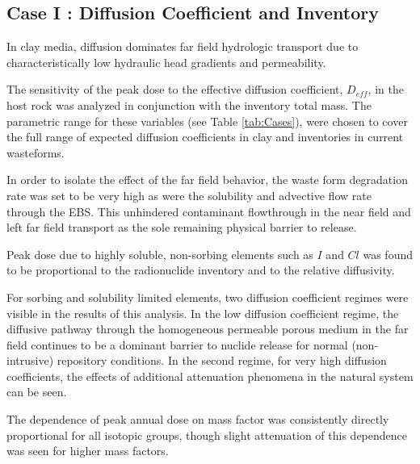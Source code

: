 
\subsection{Case I : Diffusion Coefficient and Inventory }
\label{sec:diffusivity}

In clay media, diffusion dominates far field hydrologic transport due to 
characteristically low hydraulic head gradients and permeability. 

The sensitivity of the peak dose to the effective diffusion coefficient, 
$D_{eff}$, in the host rock was analyzed in conjunction with the inventory 
total mass. The parametric range for these variables (see Table 
\ref{tab:Cases}), were chosen to cover the full range of expected diffusion 
coefficients in clay and inventories in current wasteforms.

In order to isolate the effect of the far field behavior, the waste form 
degradation rate was set to be very high as were the solubility and advective 
flow rate through the  \gls{EBS}. This unhindered contaminant flowthrough 
in the near field and left far field transport as the sole remaining physical 
barrier to release.

Peak dose due to highly soluble, non-sorbing elements such as $I$ and $Cl$ 
was found to be proportional to the radionuclide inventory and 
to the relative diffusivity. 

For sorbing and solubility limited elements,
two diffusion coefficient regimes were visible in the results of this analysis. 
In the low diffusion coefficient regime, the diffusive pathway through the 
homogeneous permeable porous medium in the far field continues to be a  dominant 
barrier to nuclide release for normal (non-intrusive) repository conditions.  
In the second regime, for very high diffusion coefficients, the effects of 
additional attenuation phenomena in the natural system can be seen. 

The dependence of peak annual dose on mass factor was consistently directly 
proportional for all isotopic groups, though slight attenuation of this 
dependence was seen for higher mass factors.
